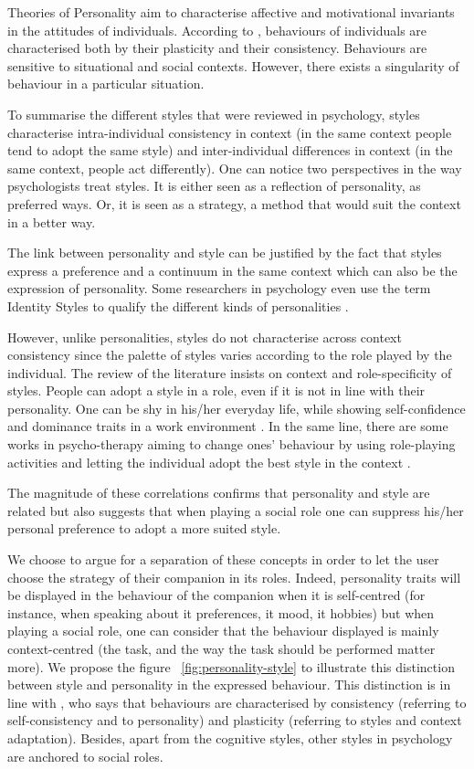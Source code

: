 \documentclass[smallextended]{svjour3}
\begin{document}
Theories of Personality aim to characterise affective and motivational invariants in the attitudes of individuals.
According to \cite{Huteau}, behaviours of individuals are characterised both by their plasticity and their consistency.
Behaviours are sensitive to situational and social contexts. 
However, there exists a singularity of behaviour in a particular situation.

To summarise the different styles that were reviewed in psychology, styles characterise intra-individual consistency in context (in the same context people tend to adopt the same style) and inter-individual differences in context (in the same context, people act differently). 
One can notice two perspectives in the way psychologists treat styles. 
It is either seen as a reflection of personality, as preferred ways. 
Or, it is seen as a strategy, a method that would suit the context in a better way. 

The link between personality and style \cite{Sternberg1997,Hayes} can be justified by the fact that styles express a preference and a continuum in the same context which can also be the expression of personality.
Some researchers in psychology even use the term Identity Styles to qualify the different kinds of personalities \cite{Berzonsky2011}.

However, unlike personalities, styles do not characterise across context consistency since the palette of styles varies according to the role played by the individual.
The review of the literature insists on context and role-specificity of styles. 
People can adopt a style in a role, even if it is not in line with their personality. 
One can be shy in his/her everyday life, while showing  self-confidence and dominance traits in a work environment .
In the same line, there are some works in psycho-therapy aiming to change ones' behaviour by using role-playing activities and letting the individual adopt the best style in the context \cite{Mehrabian1971}. 

The magnitude of these correlations confirms that personality and style are related but also suggests that when playing a social role one can suppress his/her personal preference to adopt a more suited style. 

We choose to argue for a separation of these concepts in order to let the user choose the strategy of their companion in its roles. 
Indeed, personality traits will be displayed in the behaviour of the companion when it is self-centred (for instance, when speaking about it preferences, it mood, it hobbies) but when playing a social role, one can consider that the behaviour displayed is mainly context-centred (the task, and the way the task should be performed matter more). 
We propose the figure ~\ref{fig:personality-style} to illustrate this distinction between style and personality in the expressed behaviour. 
This distinction is in line with \cite{Huteau}, who says that behaviours are characterised by consistency (referring to self-consistency and to personality) and plasticity (referring to styles and context adaptation).
Besides, apart from the cognitive styles, other styles in psychology are anchored to social roles.
\end{document}
